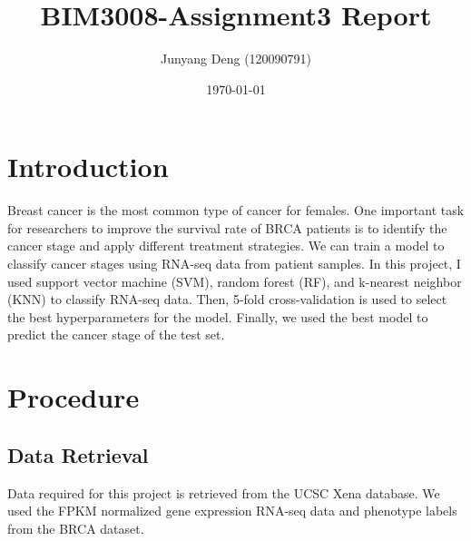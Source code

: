 \documentclass{article}
\title{BIM3008-Assignment3 Report}
\author{Junyang Deng (120090791)}
\date{\today}
\begin{document}
 
\maketitle
\section{Introduction}
Breast cancer is the most common type of cancer for females. 
One important task for researchers to improve the survival rate of BRCA patients is to identify the cancer stage and apply different treatment strategies. We can train a model to classify cancer stages using RNA-seq data from patient samples. In this project, I used support vector machine (SVM), random forest (RF), and k-nearest neighbor (KNN) to classify RNA-seq data. Then, 5-fold cross-validation is used to select the best hyperparameters for the model. Finally, we used the best model to predict the cancer stage of the test set.
\section{Procedure}
\subsection{Data Retrieval}
Data required for this project is retrieved from the UCSC Xena database. We used the FPKM normalized gene expression RNA-seq data %
and phenotype labels from the BRCA dataset. %
\end{document}
